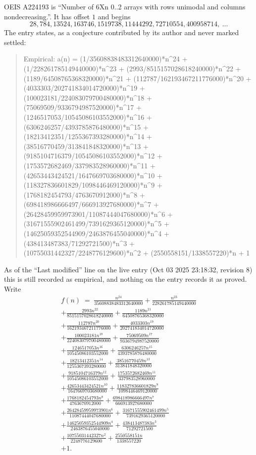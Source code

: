 \documentclass[11pt,a4paper]{article}
\theoremstyle{plain}
\theoremstyle{definition}
\begin{document}
OEIS A224193 is ``Number of 6Xn 0..2 arrays with rows unimodal and columns nondecreasing.''. It has offset $1$ and begins
\[
28, 784, 13524, 163746, 1519738, 11444292, 72710554, 400958714,\ \dots
\]
The entry states, as a conjecture contributed by its author and never marked settled:
\begin{quote}\raggedright\small
Empirical: a(n) = (1/35608838483312640000)*n\^{}24 + (1/228261785149440000)*n\^{}23 + (2993/8515157028618240000)*n\^{}22 + (1189/64508765368320000)*n\^{}21 + (112787/162193467211776000)*n\^{}20 + (4033303/202741834014720000)*n\^{}19 + (100023181/224083079700480000)*n\^{}18 + (75069509/9336794987520000)*n\^{}17 + (1246517053/10545086103552000)*n\^{}16 + (6306246257/4393785876480000)*n\^{}15 + (18213412351/1255367393280000)*n\^{}14 + (38516770459/313841848320000)*n\^{}13 + (9185104716379/10545086103552000)*n\^{}12 + (1753572682469/337983528960000)*n\^{}11 + (42653443424521/1647669703680000)*n\^{}10 + (118327836601829/1098446469120000)*n\^{}9 + (1768182454793/4763670912000)*n\^{}8 + (698418986666497/666913927680000)*n\^{}7 + (26428459959973901/11087444047680000)*n\^{}6 + (31671555902461499/7391629365120000)*n\^{}5 + (14625059352544909/2463876455040000)*n\^{}4 + (438413487383/71292721500)*n\^{}3 + (10755031442327/2248776129600)*n\^{}2 + (2550558151/1338557220)*n + 1
\end{quote}
As of the ``Last modified'' line on the live entry (Oct 03 2025 23:18:32, revision 8) this is still
recorded as empirical, and nothing on the entry records it as proved. Write
\begin{multline*}
f(n)\;=\;\frac{n^{24}}{35608838483312640000} + \frac{n^{23}}{228261785149440000} \\
+ \frac{2993 n^{22}}{8515157028618240000} + \frac{1189 n^{21}}{64508765368320000} \\
+ \frac{112787 n^{20}}{162193467211776000} + \frac{4033303 n^{19}}{202741834014720000} \\
+ \frac{100023181 n^{18}}{224083079700480000} + \frac{75069509 n^{17}}{9336794987520000} \\
+ \frac{1246517053 n^{16}}{10545086103552000} + \frac{6306246257 n^{15}}{4393785876480000} \\
+ \frac{18213412351 n^{14}}{1255367393280000} + \frac{38516770459 n^{13}}{313841848320000} \\
+ \frac{9185104716379 n^{12}}{10545086103552000} + \frac{1753572682469 n^{11}}{337983528960000} \\
+ \frac{42653443424521 n^{10}}{1647669703680000} + \frac{118327836601829 n^{9}}{1098446469120000} \\
+ \frac{1768182454793 n^{8}}{4763670912000} + \frac{698418986666497 n^{7}}{666913927680000} \\
+ \frac{26428459959973901 n^{6}}{11087444047680000} + \frac{31671555902461499 n^{5}}{7391629365120000} \\
+ \frac{14625059352544909 n^{4}}{2463876455040000} + \frac{438413487383 n^{3}}{71292721500} \\
+ \frac{10755031442327 n^{2}}{2248776129600} + \frac{2550558151 n}{1338557220} \\
+ 1.
\end{multline*}
\end{document}
